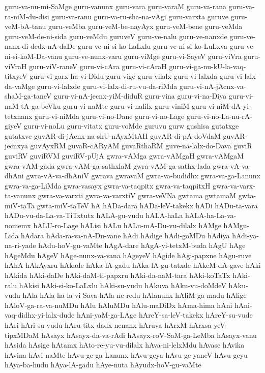{guru-va-nu-mi-SaMge
guru-vanunx
guru-vara
guru-varaM
guru-va-rana
guru-va-ra-niM-du-disi
guru-va-ranu
guru-va-ru-sha-na-vAgi
guru-varxta
guruve
guru-veM-bA-tanu
guru-veMba
guru-veM-be-nayAyx
guru-veM-bene
guru-veMda
guru-veM-de-ni-sida
guru-veMdu
guruveV
guru-ve-nalu
guru-ve-nanxde
guru-ve-nanx-di-dedx-nA-daDe
guru-ve-ni-si-ko-LaLxlu
guru-ve-ni-si-ko-LuLxva
guru-ve-ni-si-koM-Da-vanu
guru-ve-nunx-varu
guru-viMge
guru-vi-SayeV
guru-viVra
guru-viVraH
guru-viV-raneV
guru-vi-cAra
guru-vi-cAraH
guru-vi-ga-nu-kU-la-vaq-titxyeV
guru-vi-garx-ha-vi-Didu
guru-vige
guru-vilalx
guru-vi-lalxda
guru-vi-lalx-da-vaMge
guru-vi-lalxde
guru-vi-lalx-di-ru-vu-da-riMda
guru-vi-nA-jAcnx-va-shaM-ga-taneV
guru-vi-nA-jecnx-yiM-diduR
guru-vina
guru-vi-na-Diya
guru-vi-naM-tA-ga-beVku
guru-vi-naMte
guru-vi-nalilx
guru-viniM
guru-vi-niM-dA-yi-tetxnanx
guru-vi-niMda
guru-vi-no-Dane
guru-vi-no-Lage
guru-vi-no-La-nu-rA-giyeV
guru-vi-noLu
guru-vitatx
guru-voMde
guruvu
gurw
gushisa
gutatxge
gutatxve
guvAR-di-jAcnx-na-shU-nAyxMtAH
guvAR-di-pA-doVdaM
guvAR-jecnxya
guvAyxRM
guvaR-cARyAM
guvaRthaRM
guve-na-lalx-do-Dava
guviR
guviRV
guviRVM
guviRV-pUjA
gwra-vAMga
gwra-vAMgaH
gwra-vAMgaM
gwra-vAM-gada
gwra-vAM-ga-sathxlaM
gwra-vAM-ga-sathx-lada
gwra-vA-va-dhAni
gwra-vA-va-dhAniV
gwrava
gwravaM
gwra-va-budidhx
gwra-va-ga-Lanunx
gwra-va-ga-LiMda
gwra-vasayx
gwra-va-taqpitx
gwra-va-taqpitxH
gwra-va-varx-ta-vanunx
gwra-va-varxti
gwra-va-varxtiV
gwra-veVNa
gwtama
gwtamaM
gwta-miV-taTa
gwta-miV-taTeV
hA
hADa-dara
hADa-leV-takekx
hADi
hADu-ta-vara
hADu-vu-da-La-va-TiTxtutx
hALA-gu-vudu
hALA-haLa
hALA-ha-La-va-nomemx
hALU-ro-Lage
hALisi
hALu
hALu-mA-Du-vu-dilalx
hAMge
hAMgu-Lida
hAdara
hAda-ra-va-nA-Du-vane
hAdi
hAdige
hAdi-goMDu
hAdiya
hAdi-ya-na-ri-yade
hAdu-hoV-gu-vaMte
hAgA-dare
hAgA-yi-tetxM-buda
hAgU
hAge
hAgeMdu
hAgeV
hAge-nunx-va-vana
hAgeyeV
hAgide
hAgi-papxne
hAgu-ruve
hAhA
hAkAyxru
hAkade
hAka-lA-gadu
hAka-lA-gu-tatxde
hAkeM-dA-gave
hAki
hAkida
hAki-daDe
hAki-daM-ti-papxru
hAki-da-naM-tara
hAki-koTaTx
hAki-ralu
hAkisi
hAki-si-ko-LaLxlu
hAki-su-vudu
hAkuva
hAku-vu-doMdeV
hAku-vudu
hAla
hAla-ha-la-vi-Sava
hAla-ne-redu
hAlanunx
hAliM-ga-madu
hAlige
hAloV-ga-ra-va-nuMDu
hAlu
hAluMDu
hAlu-maDiDx
hAma-hima
hAni
hAni-vaq-didhx-yi-lalx-dude
hAni-yaM-ga-LAge
hAreY-sa-leV-takekx
hAreY-su-vude
hAri
hAri-su-vudu
hAru-titx-dadx-nenanx
hAruva
hArxM
hArxsa-yeV-tipxMDaM
hAsayx
hAsayx-da-va-rAdi
hAsayx-roV-SaM-ga-LeMba
hAsayx-vanu
hAsida
hAsige
hAtamx
hAto-re-yu-vu-dilalx
hAva-ni-lelxMdu
hAvase
hAvika
hAvina
hAvi-naMte
hAvu-ge-ga-Lanunx
hAvu-geya
hAvu-ge-yaneV
hAvu-geyu
hAya-ba-hudu
hAya-lA-gadu
hAye-nuta
hAyudx-hoV-gu-vaMte
}
